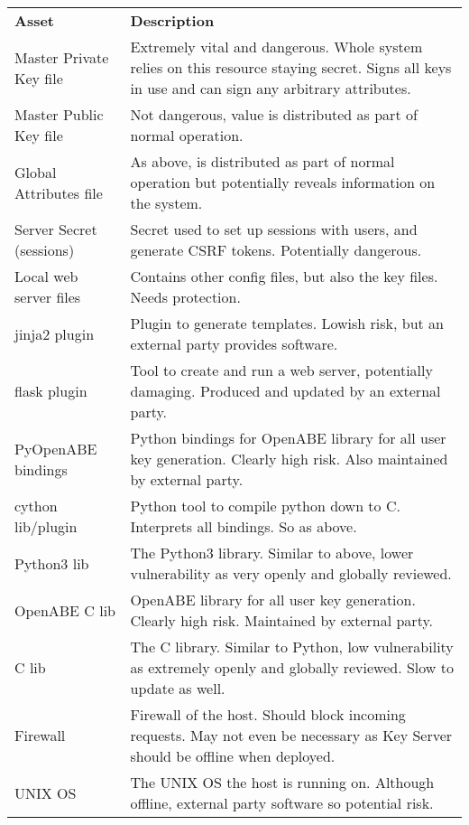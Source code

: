 \begin{table}[]
  \label{tab:assets_mk}
  \begin{tabularx}{\linewidth}{lX}
    \textbf{Asset}        & \textbf{Description} \\
    Master Private Key file   &	Extremely vital and dangerous. Whole system relies on this resource staying secret. Signs all keys in use and can sign any arbitrary attributes.  \\
    Master Public Key file    &	Not dangerous, value is distributed as part of normal operation. \\
    Global Attributes file    &	As above, is distributed as part of normal operation but potentially reveals information on the system. \\
    Server Secret (sessions)  &	Secret used to set up sessions with users, and generate CSRF tokens. Potentially dangerous. \\
    Local web server files    &	Contains other config files, but also the key files. Needs protection. \\
    jinja2 plugin             &	Plugin to generate templates. Lowish risk, but an external party provides software. \\
    flask plugin              &	Tool to create and run a web server, potentially damaging. Produced and updated by an external party. \\
    PyOpenABE bindings        &	Python bindings for OpenABE library for all user key generation. Clearly high risk. Also maintained by external party. \\
    cython lib/plugin         &	Python tool to compile python down to C. Interprets all bindings. So as above. \\
    Python3 lib               &	The Python3 library. Similar to above, lower vulnerability as very openly and globally reviewed. \\
    OpenABE C lib             &	OpenABE library for all user key generation. Clearly high risk. Maintained by external party. \\
    C lib                     &	The C library. Similar to Python, low vulnerability as extremely openly and globally reviewed. Slow to update as well. \\
    Firewall                  &	Firewall of the host. Should block incoming requests. May not even be necessary as Key Server should be offline when deployed. \\
    UNIX OS                   &	The UNIX OS the host is running on. Although offline, external party software so potential risk.
  \end{tabularx}
\end{table}

